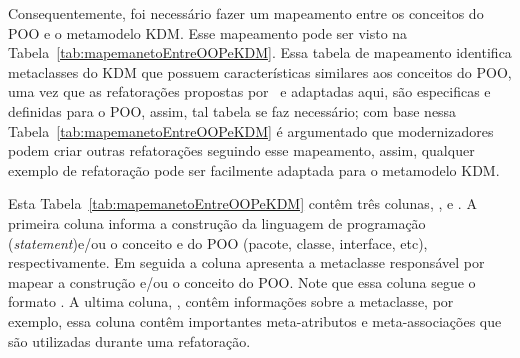Consequentemente, foi necessário fazer um mapeamento entre os conceitos do POO e o metamodelo KDM. Esse mapeamento pode ser visto na Tabela~\ref{tab:mapemanetoEntreOOPeKDM}. Essa tabela de mapeamento identifica metaclasses do KDM que possuem características similares aos conceitos do POO, uma vez que as refatorações propostas por~ e adaptadas aqui, são especificas e definidas para o POO, assim, tal tabela se faz necessário; com base nessa Tabela~\ref{tab:mapemanetoEntreOOPeKDM} é argumentado que modernizadores podem criar outras refatorações seguindo esse mapeamento, assim, qualquer exemplo de refatoração pode ser facilmente adaptada para o metamodelo KDM. 

Esta Tabela~\ref{tab:mapemanetoEntreOOPeKDM} contêm três colunas, ,  e . A primeira coluna informa a construção da linguagem de programação (\textit{statement})e/ou o conceito e do POO (pacote, classe, interface, etc), respectivamente. Em seguida a coluna  apresenta a metaclasse responsável por mapear a construção e/ou o conceito do POO. Note que essa coluna segue o formato . A ultima coluna, , contêm informações sobre a metaclasse, por exemplo, essa coluna contêm importantes meta-atributos e meta-associações que são utilizadas durante uma refatoração.


